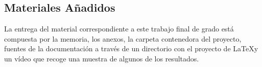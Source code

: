 \subsection{Materiales Añadidos}
La entrega del material correspondiente a este trabajo final de grado está compuesta por la memoria, los anexos, la carpeta contenedora del proyecto, fuentes de la documentación a través de un directorio con el proyecto de \LaTeX y un vídeo que recoge una muestra de algunos de los resultados.